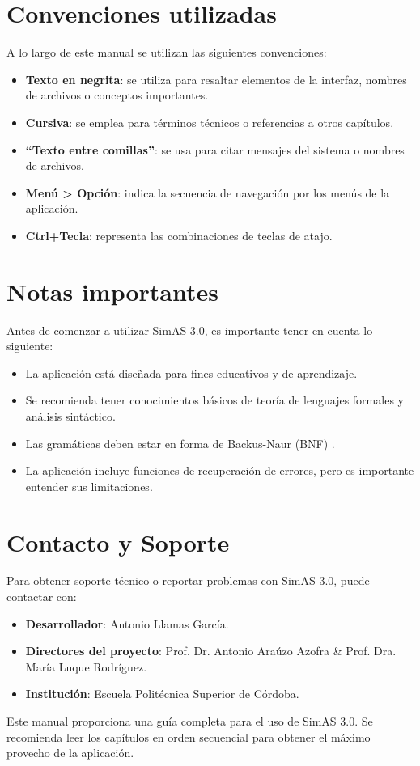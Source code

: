 \section{Convenciones utilizadas}

A lo largo de este manual se utilizan las siguientes convenciones:

\begin{itemize}
    \item \textbf{Texto en negrita}: se utiliza para resaltar elementos de la interfaz, nombres de archivos o conceptos importantes.
    \item \textbf{Cursiva}: se emplea para términos técnicos o referencias a otros capítulos.
    \item \textbf{``Texto entre comillas''}: se usa para citar mensajes del sistema o nombres de archivos.
    \item \textbf{Menú > Opción}: indica la secuencia de navegación por los menús de la aplicación.
    \item \textbf{Ctrl+Tecla}: representa las combinaciones de teclas de atajo.
\end{itemize}

\section{Notas importantes}

Antes de comenzar a utilizar SimAS 3.0, es importante tener en cuenta lo siguiente:

\begin{itemize}
    \item La aplicación está diseñada para fines educativos y de aprendizaje.
    \item Se recomienda tener conocimientos básicos de teoría de lenguajes formales y análisis sintáctico.
    \item Las gramáticas deben estar en forma de Backus-Naur (BNF) \cite{bnf}.
    \item La aplicación incluye funciones de recuperación de errores, pero es importante entender sus limitaciones.
\end{itemize}

\section{Contacto y Soporte}

Para obtener soporte técnico o reportar problemas con SimAS 3.0, puede contactar con:

\begin{itemize}
    \item \textbf{Desarrollador}: Antonio Llamas García.
    \item \textbf{Directores del proyecto}: Prof. Dr. Antonio Araúzo Azofra \& Prof. Dra. María Luque Rodríguez.
    \item \textbf{Institución}: Escuela Politécnica Superior de Córdoba.
\end{itemize}

Este manual proporciona una guía completa para el uso de SimAS 3.0. Se recomienda leer los capítulos en orden secuencial para obtener el máximo provecho de la aplicación.